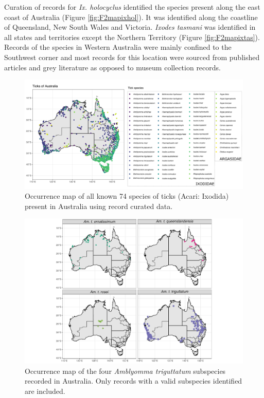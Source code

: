 \documentclass[a4paper, nobind]{templates/ociamthesis}
\begin{document}
Curation of records for \emph{Ix. holocyclus} identified the species present along the east coast of Australia (Figure \ref{fig:F2mapixhol}).
It was identified along the coastline of Queensland, New South Wales and Victoria.
\emph{Ixodes tasmani} was identified in all states and territories except the Northern Territory (Figure \ref{fig:F2mapixtas}).
Records of the species in Western Australia were mainly confined to the Southwest corner and most records for this location were sourced from published articles and grey literature as opposed to museum collection records.

\newpage

\begin{figure}
\includegraphics[width=0.95\linewidth]{figures/ms-figs/Ch2-mapallticks} \caption[Map of tick species present in Australia.]{Occurrence map of all known 74 species of ticks (Acari: Ixodida) present in Australia using record curated data.}\label{fig:F2mapall}
\end{figure}

\newpage

\begin{figure}
\includegraphics[width=0.95\linewidth]{figures/ms-figs/Ch2-amtrisubsp} \caption[Map of \textit{Amblyomma triguttatum} subspecies.]{Occurrence map of the four \textit{Amblyomma triguttatum} subspecies recorded in Australia. Only records with a valid subspecies identified are included.}\label{fig:F2atrigmapsubp}
\end{figure}
\end{document}
